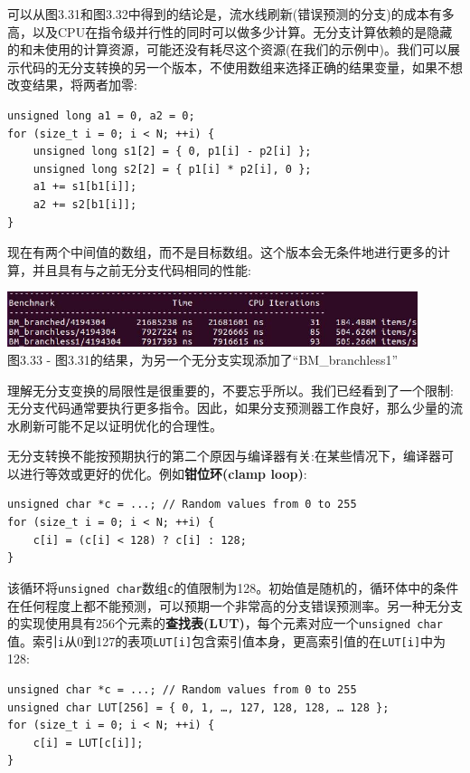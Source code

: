 可以从图3.31和图3.32中得到的结论是，流水线刷新(错误预测的分支)的成本有多高，以及CPU在指令级并行性的同时可以做多少计算。无分支计算依赖的是隐藏的和未使用的计算资源，可能还没有耗尽这个资源(在我们的示例中)。我们可以展示代码的无分支转换的另一个版本，不使用数组来选择正确的结果变量，如果不想改变结果，将两者加零:

\begin{lstlisting}[style=styleCXX]
unsigned long a1 = 0, a2 = 0;
for (size_t i = 0; i < N; ++i) {
	unsigned long s1[2] = { 0, p1[i] - p2[i] };
	unsigned long s2[2] = { p1[i] * p2[i], 0 };
	a1 += s1[b1[i]];
	a2 += s2[b1[i]];
}
\end{lstlisting}

现在有两个中间值的数组，而不是目标数组。这个版本会无条件地进行更多的计算，并且具有与之前无分支代码相同的性能:

\begin{center}
\includegraphics[width=0.9\textwidth]{content/1/chapter3/images/33.jpg}\\
图3.33 - 图3.31的结果，为另一个无分支实现添加了“BM\_branchless1”
\end{center}

理解无分支变换的局限性是很重要的，不要忘乎所以。我们已经看到了一个限制:无分支代码通常要执行更多指令。因此，如果分支预测器工作良好，那么少量的流水刷新可能不足以证明优化的合理性。

无分支转换不能按预期执行的第二个原因与编译器有关:在某些情况下，编译器可以进行等效或更好的优化。例如\textbf{钳位环(clamp loop)}:

\begin{lstlisting}[style=styleCXX]
unsigned char *c = ...; // Random values from 0 to 255
for (size_t i = 0; i < N; ++i) {
	c[i] = (c[i] < 128) ? c[i] : 128;
}
\end{lstlisting}

该循环将\texttt{unsigned char}数组\texttt{c}的值限制为128。初始值是随机的，循环体中的条件在任何程度上都不能预测，可以预期一个非常高的分支错误预测率。另一种无分支的实现使用具有256个元素的\textbf{查找表(LUT)}，每个元素对应一个\texttt{unsigned char}值。索引\texttt{i}从0到127的表项\texttt{LUT[i]}包含索引值本身，更高索引值的在\texttt{LUT[i]}中为128:

\begin{lstlisting}[style=styleCXX]
unsigned char *c = ...; // Random values from 0 to 255
unsigned char LUT[256] = { 0, 1, …, 127, 128, 128, … 128 };
for (size_t i = 0; i < N; ++i) {
	c[i] = LUT[c[i]];
}
\end{lstlisting}

